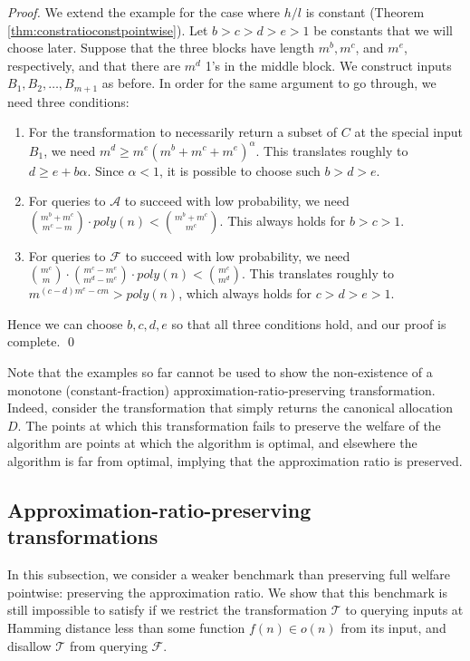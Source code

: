 \documentclass[runningheads,a4paper]{llncs}
\begin{document}
\begin{proof}
We extend the example for the case where $h/l$ is constant (Theorem \ref{thm:constratioconstpointwise}). Let $b>c>d>e>1$ be constants that we will choose later. Suppose that the three blocks have length $m^b, m^c$, and $m^e$, respectively, and that there are $m^d$ 1's in the middle block. We construct inputs $B_1,B_2,\dots,B_{m+1}$ as before. In order for the same argument to go through, we need three conditions:
\begin{enumerate}
\item For the transformation to necessarily return a subset of $C$ at the special input $B_1$, we need $m^d\geq m^e(m^b+m^c+m^e)^\alpha$. This translates roughly to $d\geq e+b\alpha$. Since $\alpha<1$, it is possible to choose such $b>d>e$.

\item For queries to $\mathcal{A}$ to succeed with low probability, we need $\binom{m^b+m^c}{m^c-m}\cdot poly(n)<\binom{m^b+m^c}{m^c}$. This always holds for $b>c>1$.

\item For queries to $\mathcal{F}$ to succeed with low probability, we need $\binom{m^c}{m}\cdot\binom{m^c-m^e}{m^d-m^e}\cdot poly(n)<\binom{m^c}{m^d}$. This translates roughly to $m^{(c-d)m^e-cm}>poly(n)$, which always holds for $c>d>e>1$.
\end{enumerate}
Hence we can choose $b,c,d,e$ so that all three conditions hold, and our proof is complete. \qed
\end{proof}

Note that the examples so far cannot be used to show the non-existence of a monotone (constant-fraction) approximation-ratio-preserving transformation. Indeed, consider the transformation that simply returns the canonical allocation $D$. The points at which this transformation fails to preserve the welfare of the algorithm are points at which the algorithm is optimal, and elsewhere the algorithm is far from optimal, implying that the approximation ratio is preserved.

\subsection{Approximation-ratio-preserving transformations}

In this subsection, we consider a weaker benchmark than preserving full welfare pointwise: preserving the approximation ratio. We show that this benchmark is still impossible to satisfy if we restrict the transformation $\mathcal{T}$ to querying inputs at Hamming distance less than some function $f(n)\in o(n)$ from its input, and disallow $\mathcal{T}$ from querying $\mathcal{F}$.
\end{document}
